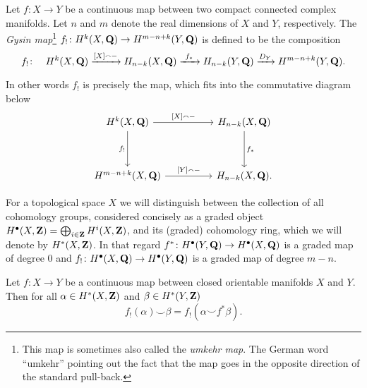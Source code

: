 \begin{definition}
    \label{Definition of umkehr map}
    Let $f \colon X \to Y$ be a continuous map between two compact connected complex manifolds. Let $n$ and $m$ denote the real dimensions of $X$ and $Y$, respectively.
    The \emph{Gysin map}\footnote{This map is sometimes also called the \emph{umkehr map}. The German word ``umkehr'' pointing out the fact that the map goes in the opposite direction of the standard pull-back.} $f_! \colon H^{k}(X, \mathbf Q) \to H^{m-n+k}(Y, \mathbf Q)$ is defined to be the composition
    \[
        f_! \colon \quad H^{k}(X, \mathbf Q) \xrightarrow{[X] \smallfrown -} H_{n-k}(X, \mathbf Q) \xrightarrow{\ f_* \ } H_{n-k}(Y, \mathbf Q) \xrightarrow{D_Y} H^{m-n+k}(Y, \mathbf Q).
    \]
\end{definition}

\begin{remark}
    In other words $f_!$ is precisely the map, which fits into the commutative diagram below
    \[\begin{tikzcd}
        \cohom{k}{X}{\Q} && H_{n-k}(X, \Q) \\
        \\
        \cohom{m-n+k}{X}{\Q} && H_{n-k}(X, \Q).
        \arrow["{[X] \smallfrown -}", from=1-1, to=1-3]
        \arrow["{f_!}"', from=1-1, to=3-1]
        \arrow["{f_*}", from=1-3, to=3-3]
        \arrow["{[Y] \smallfrown -}", from=3-1, to=3-3]
    \end{tikzcd}\]
\end{remark}

\begin{remark}
    For a topological space $X$ we will distinguish between the collection of all cohomology groups, considered concisely as a graded object $H^{\bullet}(X, \mathbf Z) = \bigoplus_{i\in \mathbf Z} H^{i}(X, \mathbf Z)$, and its (graded) cohomology ring, which we will denote by $H^{*}(X, \mathbf Z)$. In that regard $f^* \colon H^{\bullet}(Y, \mathbf Q) \to H^{\bullet}(X, \mathbf Q)$ is a graded map of degree $0$ and $f_! \colon H^{\bullet}(X, \mathbf Q) \to H^{\bullet}(Y, \mathbf Q)$ is a graded map of degree $m - n$.
\end{remark}

\begin{proposition}
    \label{cohomological projection formula}
    Let $f \colon X \to Y$ be a continuous map between closed orientable manifolds $X$ and $Y$. Then for all $\alpha \in H^{*}(X, \mathbf Z)$ and $\beta \in H^{*}(Y, \mathbf Z)$
    \begin{equation}
        \label{eq: cohomological projection formula}
        f_!(\alpha) \smallsmile \beta = f_!(\alpha \smallsmile f^*\beta).
    \end{equation}
\end{proposition}

